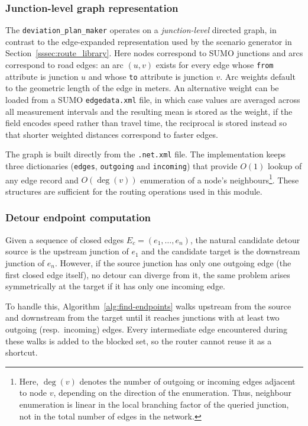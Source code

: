 \subsubsection{Junction-level graph representation}

The \texttt{deviation\_plan\_maker} operates on a \emph{junction-level}
directed graph, in contrast to the edge-expanded representation used by
the scenario generator in Section~\ref{sssec:route_library}. Here
nodes correspond to SUMO junctions and arcs correspond to road edges:
an arc $(u, v)$ exists for every edge whose \texttt{from} attribute is
junction $u$ and whose \texttt{to} attribute is junction $v$. Arc weights
default to the geometric length of the edge in meters. An alternative
weight can be loaded from a SUMO \texttt{edgedata.xml} file, in which
case values are averaged across all measurement intervals and the
resulting mean is stored as the weight, if the field encodes speed
rather than travel time, the reciprocal is stored instead so that
shorter weighted distances correspond to faster edges.

The graph is built directly from the \texttt{.net.xml} file. The implementation keeps
three dictionaries (\texttt{edges}, \texttt{outgoing} and \texttt{incoming})
that provide $O(1)$ lookup of any edge record and $O(\deg(v))$ enumeration of a
node's neighbours\footnote{Here, $\deg(v)$ denotes the number of outgoing
or incoming edges adjacent to node $v$, depending on the direction of the
enumeration. Thus, neighbour enumeration is linear in the local branching
factor of the queried junction, not in the total number of edges in the
network.}. These structures are sufficient for the routing operations used in
this module.

\subsubsection{Detour endpoint computation}
\label{sssec:detour_endpoints}

Given a sequence of closed edges $E_c = (e_1, \ldots, e_n)$, the natural
candidate detour source is the upstream junction of $e_1$ and the
candidate target is the downstream junction of $e_n$. However, if the
source junction has only one outgoing edge (the first closed edge
itself), no detour can diverge from it, the same problem arises
symmetrically at the target if it has only one incoming edge.

To handle this, Algorithm~\ref{alg:find-endpoints} walks upstream from the
source and downstream from the target until it reaches junctions with at least
two outgoing (resp.\ incoming) edges. Every intermediate edge encountered
during these walks is added to the blocked set, so the router cannot reuse it
as a shortcut.


